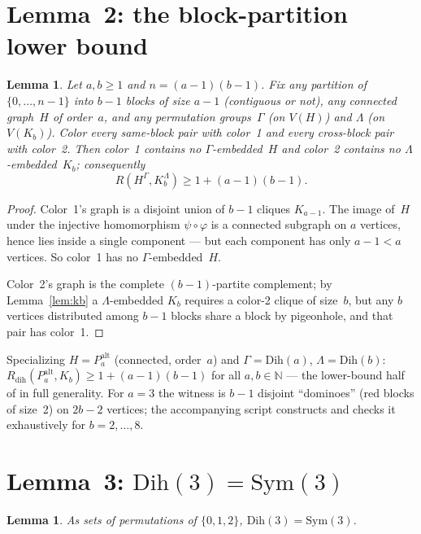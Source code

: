 \documentclass[11pt]{article}
\newtheorem{lemma}[theorem]{Lemma}
\theoremstyle{definition}
\newcommand{\Dih}{\mathrm{Dih}}
\newcommand{\Sym}{\mathrm{Sym}}
\newcommand{\Rdih}{R_{\mathrm{dih}}}
\begin{document}
\section{Lemma~2: the block-partition lower bound}

\begin{lemma}\label{lem:lower}
Let $a, b \ge 1$ and $n = (a-1)(b-1)$. Fix any partition of $\{0, \ldots, n-1\}$
into $b-1$ blocks of size $a-1$ (contiguous or not), any connected graph~$H$ of
order~$a$, and any permutation groups~$\Gamma$ (on $V(H)$) and $\Lambda$ (on
$V(K_b)$). Color every same-block pair with color~1 and every cross-block pair
with color~2. Then color~1 contains no $\Gamma$-embedded~$H$ and color~2 contains
no $\Lambda$-embedded~$K_b$; consequently
\[
  R(H^\Gamma, K_b^\Lambda) \ge 1 + (a-1)(b-1).
\]
\end{lemma}

\begin{proof}
Color~1's graph is a disjoint union of $b-1$ cliques $K_{a-1}$. The image of~$H$
under the injective homomorphism $\psi \circ \varphi$ is a connected subgraph on
$a$ vertices, hence lies inside a single component --- but each component has only
$a-1 < a$ vertices. So color~1 has no $\Gamma$-embedded~$H$.

Color~2's graph is the complete $(b{-}1)$-partite complement; by
Lemma~\ref{lem:kb} a $\Lambda$-embedded $K_b$ requires a color-2 clique of
size~$b$, but any $b$ vertices distributed among $b-1$ blocks share a block by
pigeonhole, and that pair has color~1.
\end{proof}

Specializing $H = P_a^{\mathrm{alt}}$ (connected, order~$a$) and $\Gamma = \Dih(a)$,
$\Lambda = \Dih(b)$: $\Rdih(P_a^{\mathrm{alt}}, K_b) \ge 1 + (a-1)(b-1)$ for all
$a, b \in \mathbb{N}$ --- the lower-bound half of \cite[Conjecture~4.9]{DD26} in
full generality. For $a=3$ the witness is $b-1$ disjoint ``dominoes'' (red blocks
of size~2) on $2b-2$ vertices; the accompanying script constructs and checks it
exhaustively for $b = 2,\ldots,8$.

\section{Lemma~3: $\Dih(3) = \Sym(3)$}

\begin{lemma}\label{lem:dih3}
As sets of permutations of $\{0, 1, 2\}$, $\Dih(3) = \Sym(3)$.
\end{lemma}
\end{document}
